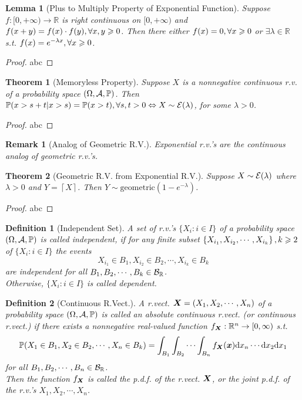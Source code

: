 \documentclass[openany,12pt]{book}
\newtheorem{theorem}{Theorem}[chapter]
\newtheorem{remark}{Remark}[chapter]
\newtheorem{lemma}{Lemma}[chapter]
\newtheorem{definition}{Definition}[chapter]
\begin{document}
\begin{lemma}[Plus to Multiply Property of Exponential Function]
  Suppose $f:[0,+\infty)\to\mathbb{R}$ is right continuous on $[0,+\infty)$ and $f(x+y)=f(x)\cdot f(y), \forall x,y\geqslant0$. Then there either $f(x)=0, \forall x\geqslant0$ or $\exists\lambda\in\mathbb{R}$ s.t. $f(x)=e^{-\lambda x}, \forall x\geqslant0$.
\end{lemma}

\begin{proof}
  abc
\end{proof}

\begin{theorem}[Memoryless Property]
  Suppose $X$ is a nonnegative continuous r.v. of a probability space $(\Omega,\mathcal{A},\mathbb{P})$. Then $\mathbb{P}(x>s+t| x>s)=\mathbb{P}(x>t), \forall s,t>0 \Leftrightarrow X\sim\mathcal{E}(\lambda)$, for some $\lambda>0$.
\end{theorem}

\begin{proof}
  abc
\end{proof}

\begin{remark}[Analog of Geometric R.V.]
  Exponential r.v.'s are the continuous analog of geometric r.v.'s.
\end{remark}

\begin{theorem}[Geometric R.V. from Exponential R.V.]
  Suppose $X\sim\mathcal{E}(\lambda)$ where $\lambda>0$ and $Y=\left\lceil X\right\rceil$. Then $Y\sim\mathrm{geometric}\left(1-e^{-\lambda}\right)$.
\end{theorem}

\begin{proof}
  abc
\end{proof}

\begin{definition}[Independent Set]
  A set of r.v.'s $\{X_i:i\in I\}$ of a probability space $(\Omega,\mathcal{A},\mathbb{P})$ is called independent, if for any finite subset $\left\{X_{i_1},X_{i_2}, \cdots,X_{i_k}\right\}, k\geqslant2$ of $\{X_i:i\in I\}$ the events
  $$
    X_{i_1}\in B_1, X_{i_2}\in B_2, \cdots,X_{i_k}\in B_k
  $$
  are independent for all $B_1,B_2, \cdots,B_k\in\mathcal{B}_\mathbb{R}$.\\
  Otherwise, $\{X_i:i\in I\}$ is called dependent.
\end{definition}

\begin{definition}[Continuous R.Vect.]
  A r.vect. $\bm{X}=(X_1, X_2, \cdots,X_n)$ of a probability space $(\Omega,\mathcal{A},\mathbb{P})$ is called an absolute continuous r.vect. (or continuous r.vect.) if there exists a nonnegative real-valued function $f_{\bm{X}}:\mathbb{R}^n\to[0,\infty)$ s.t.
  $$
    \mathbb{P}(X_1\in B_1,X_2\in B_2, \cdots,X_n\in B_k)=\int_{B_1}\int_{B_2}{\cdots\int_{B_n}{f_{\bm{X}}(\bm{x})\mathrm{d} x_n}}\cdots \mathrm{d} x_2\mathrm{d} x_1
  $$
  for all $B_1,B_2, \cdots,B_n\in\mathcal{B}_\mathbb{R}$.\\
  Then the function $f_{\bm{X}}$ is called the p.d.f. of the r.vect. $\bm{X}$, or the joint p.d.f. of the r.v.'s $X_1, X_2, \cdots,X_n$.
\end{definition}
\end{document}
